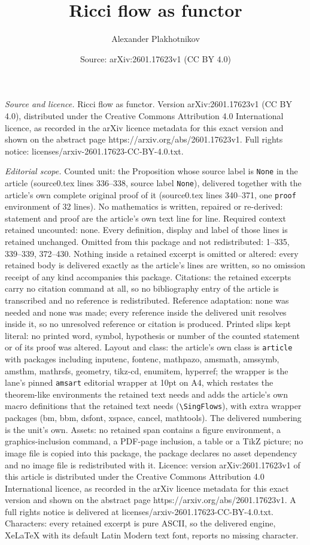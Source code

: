 \documentclass[10pt,a4paper]{amsart}
\title[Ricci flow as functor]{Ricci flow as functor}
\author{Alexander Plakhotnikov}
\date{Source: arXiv:2601.17623v1 (CC BY 4.0)}
\begin{document}
\maketitle

\noindent\emph{Source and licence.} Ricci flow as functor. Version arXiv:2601.17623v1 (CC BY 4.0), distributed under the Creative Commons Attribution 4.0 International licence, as recorded in the arXiv licence metadata for this exact version and shown on the abstract page https://arxiv.org/abs/2601.17623v1. Full rights notice: licenses/arxiv-2601.17623-CC-BY-4.0.txt.\par\smallskip

\noindent\textit{Editorial scope.} Counted unit: the Proposition whose source label is \texttt{None} in the article (source0.tex lines 336--338, source label \texttt{None}), delivered together with the article's own complete original proof of it (source0.tex lines 340--371, one \texttt{proof} environment of 32 lines). No mathematics is written, repaired or re-derived: statement and proof are the article's own text line for line. Required context retained uncounted: none. Every definition, display and label of those lines is retained unchanged. Omitted from this package and not redistributed: 1--335, 339--339, 372--430. Nothing inside a retained excerpt is omitted or altered: every retained body is delivered exactly as the article's lines are written, so no omission receipt of any kind accompanies this package. Citations: the retained excerpts carry no citation command at all, so no bibliography entry of the article is transcribed and no reference is redistributed. Reference adaptation: none was needed and none was made; every reference inside the delivered unit resolves inside it, so no unresolved reference or citation is produced. Printed slips kept literal: no printed word, symbol, hypothesis or number of the counted statement or of its proof was altered. Layout and class: the article's own class is \texttt{article} with packages including inputenc, fontenc, mathpazo, amsmath, amssymb, amsthm, mathrsfs, geometry, tikz-cd, enumitem, hyperref; the wrapper is the lane's pinned \texttt{amsart} editorial wrapper at 10pt on A4, which restates the theorem-like environments the retained text needs and adds the article's own macro definitions that the retained text needs (\texttt{\textbackslash SingFlows}), with extra wrapper packages (bm, bbm, dsfont, xspace, cancel, mathtools). The delivered numbering is the unit's own. Assets: no retained span contains a figure environment, a graphics-inclusion command, a PDF-page inclusion, a table or a TikZ picture; no image file is copied into this package, the package declares no asset dependency and no image file is redistributed with it. Licence: version arXiv:2601.17623v1 of this article is distributed under the Creative Commons Attribution 4.0 International licence, as recorded in the arXiv licence metadata for this exact version and shown on the abstract page https://arxiv.org/abs/2601.17623v1. A full rights notice is delivered at licenses/arxiv-2601.17623-CC-BY-4.0.txt. Characters: every retained excerpt is pure ASCII, so the delivered engine, XeLaTeX with its default Latin Modern text font, reports no missing character.
\end{document}
